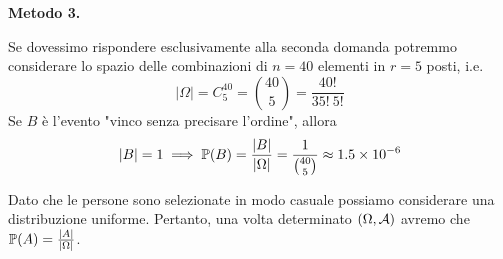 \textbf{Metodo 3.}

Se dovessimo rispondere esclusivamente alla seconda domanda potremmo considerare lo spazio delle combinazioni di $n=40$ elementi in $r=5$ posti, i.e.
\begin{equation*}
	| \Omega | =C_{5}^{40} =\binom{40}{5} =\frac{40!}{35!\ 5!}
\end{equation*}
Se $B$ è l'evento "vinco senza precisare l'ordine", allora
\begin{equation*}
	| B| =1\implies \mathbb{P}(B) =\frac{| B| }{| \Omega | } =\frac{1}{\binom{40}{5}} \approx 1.5\times 10^{-6}
\end{equation*}

\Soluzione

Dato che le persone sono selezionate in modo casuale possiamo considerare una distribuzione uniforme. Pertanto, una volta determinato $(\Omega ,\mathcal{A})$ avremo che $\mathbb{P}(A) =\frac{| A| }{| \Omega | }$.
